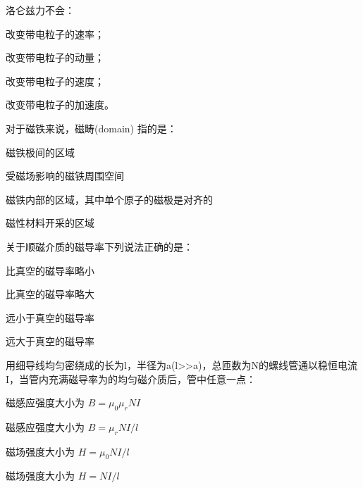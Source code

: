 \documentclass{njustexam}
\begin{document}
\begin{problem}

  洛仑兹力不会：
  \begin{abcd}
    \item 改变带电粒子的速率；  
    \item 改变带电粒子的动量；
    \item 改变带电粒子的速度；  
    \item 改变带电粒子的加速度。
  \end{abcd}
  \end{problem}


  \begin{problem}

      对于磁铁来说，磁畴(domain) 指的是：
      \begin{abcd}
        \item 磁铁极间的区域
        \item 受磁场影响的磁铁周围空间
        \item 磁铁内部的区域，其中单个原子的磁极是对齐的
        \item 磁性材料开采的区域
      \end{abcd}
  \end{problem}


  \begin{problem}

    关于顺磁介质的磁导率下列说法正确的是：
    \begin{abcd}
      \item 比真空的磁导率略小
      \item 比真空的磁导率略大
      \item 远小于真空的磁导率
      \item 远大于真空的磁导率
    \end{abcd}
\end{problem}

\begin{problem}

  用细导线均匀密绕成的长为l，半径为a(l>>a)，总匝数为N的螺线管通以稳恒电流I，当管内充满磁导率为的均匀磁介质后，管中任意一点：
  \begin{abcd}
    \item 磁感应强度大小为 $B=\mu_0 \mu_r N I$

    \item 磁感应强度大小为 $B=\mu_r N I / l $

    \item 磁场强度大小为 $H=\mu_0 N I / l$

    \item 磁场强度大小为 $H=N I / l$
  \end{abcd}
\end{problem}
\end{document}
